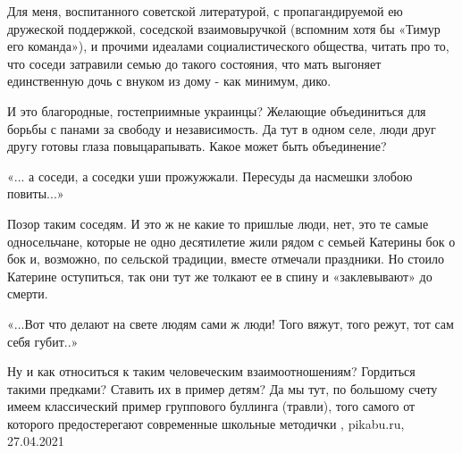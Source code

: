 Для меня, воспитанного советской литературой, с пропагандируемой ею дружеской
поддержкой, соседской взаимовыручкой (вспомним хотя бы «Тимур его команда»), и
прочими идеалами социалистического общества, читать про то, что соседи
затравили семью до такого состояния, что мать выгоняет единственную дочь с
внуком из дому - как минимум, дико.

И это благородные, гостеприимные украинцы? Желающие объединиться для борьбы с
панами за свободу и независимость. Да тут в одном селе, люди друг другу готовы
глаза повыцарапывать. Какое может быть объединение?

\obeycr
«... а соседи, а соседки
уши прожужжали.
Пересуды да насмешки
злобою повиты...»
\restorecr

Позор таким соседям. И это ж не какие то пришлые люди, нет, это те самые
односельчане, которые не одно десятилетие жили рядом с семьей Катерины бок о
бок и, возможно, по сельской традиции, вместе отмечали праздники. Но стоило
Катерине оступиться, так они тут же толкают ее в спину и «заклевывают» до
смерти.

«...Вот что делают на свете
людям сами ж люди!
Того вяжут, того режут,
тот сам себя губит..»

Ну и как относиться к таким человеческим взаимоотношениям?  Гордиться такими
предками? Ставить их в пример детям? Да мы тут, по большому счету имеем
классический пример группового буллинга (травли), того самого от которого
предостерегают современные школьные методички
, pikabu.ru, 27.04.2021
